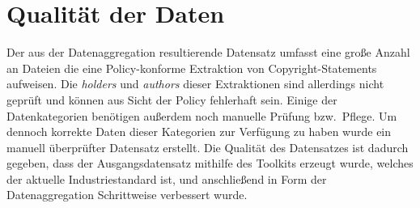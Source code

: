 
\section{Qualität der Daten}\label{sec:qualitaet-der-daten}

Der aus der Datenaggregation resultierende Datensatz umfasst eine große Anzahl an Dateien die eine Policy-konforme Extraktion von Copyright-Statements aufweisen.
Die \textit{holders} und \textit{authors} dieser Extraktionen sind allerdings nicht geprüft und können aus Sicht der Policy fehlerhaft sein.
Einige der Datenkategorien benötigen außerdem noch manuelle Prüfung bzw.\ Pflege.
Um dennoch korrekte Daten dieser Kategorien zur Verfügung zu haben wurde ein manuell überprüfter Datensatz erstellt.
Die Qualität des Datensatzes ist dadurch gegeben, dass der Ausgangsdatensatz mithilfe des Toolkits erzeugt wurde, welches der aktuelle Industriestandard ist, und anschließend in Form der Datenaggregation Schrittweise verbessert wurde.
